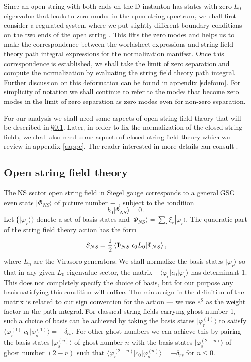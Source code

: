 \documentclass[12pt,a4paper]{article}
\newcommand{\be}{\begin{equation}}
\newcommand{\ee}{\end{equation}}
\newcommand{\vp}{\varphi}
\begin{document}
Since an open string with both ends on the D-instanton has states with zero $L_0$ eigenvalue
that leads to zero modes in the open string spectrum, we shall first consider a regulated
system where we put slightly different boundary conditions on the two ends of the open
string \cite{Sen:2021tpp,Alexandrov:2021shf,Alexandrov:2021dyl}.
This lifts the zero modes and helps us to make the correspondence between the worldsheet
expressions and string field theory path integral expressions for the normalization manifest.
Once this correspondence is established, we shall take the limit of zero separation and
compute the normalization by evaluating the string field theory
path integral.
Further discussion on this deformation can be found in appendix \ref{sdeform}.
For
simplicity of notation we shall continue to refer to the modes that become zero
modes in the limit of zero separation as zero modes even for non-zero
separation.


For our analysis we shall need some aspects of open string field theory that will be described
in \S\ref{sopensft}. Later, in order to
fix the normalization of the closed string fields, we shall also need some aspects of closed string
field theory which we review in appendix \ref{eappc}. The reader interested in
more details can consult
\cite{Taylor:2003gn,Okawa:2012ica,deLacroix:2017lif,Erler:2019vhl,Erler:2019loq,Erbin:2021smf}.



\subsection{Open string field theory} \label{sopensft}

The NS sector open string field in Siegel gauge corresponds to a general
GSO even state $|\Phi_{NS}\rangle$ of picture number $-1$, subject to the condition
\be
b_0|\Phi_{NS}\rangle=0\, .
\ee
Let $\{|\vp_r\rangle\}$ denote a set of basis states and $|\Phi_{NS}\rangle = \sum_r \xi_r |\vp_r\rangle$.
The quadratic part of the string field theory action has the form
\be
\label{esNS}
S_{NS}={1\over 2} \, \langle \Phi_{NS}|c_0 L_0|\Phi_{NS}\rangle \, ,
\ee
where $L_n$ are the Virasoro generators. We shall normalize the basis states $|\vp_r\rangle$
so that in any given $L_0$ eigenvalue sector, the matrix $-\langle \vp_r|c_0|\vp_s\rangle$
has determinant 1. This does not completely specify the choice of basis, but for our
purpose any basis satisfying this condition will suffice. The minus sign in the definition of the
matrix is related to our sign convention for the action --- we use $e^S$ as the weight factor in
the path integral. For classical string fields carrying ghost number 1,
such a choice of basis can be achieved by taking the basis states
$|\vp^{(1)}_r\rangle$ to satisfy $\langle\vp^{(1)}_r| c_0|\vp^{(1)}_s\rangle=-\delta_{rs}$.
For other ghost numbers we can achieve this by pairing the basis states
$|\vp^{(n)}_s\rangle$ of ghost number $n$ with the basis states $|\vp^{(2-n)}_s\rangle$
of ghost number $(2-n)$ such that
$\langle\vp^{(2-n)}_r|c_0|\vp^{(n)}_s\rangle=-\delta_{rs}$ for $n\le 0$.
\end{document}
